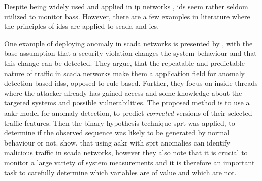 

\begin{comment}
	\begin{itemize}
		\item \parencite{Yang2006}
		\item \parencite{Celeda2012}
		\item \textcite{Pan2014} BACnet
			\begin{itemize}
				\item Anonmaly detection for BACnet fire alarm systems
				\item taps BACnet traffic via IP
				\item rule based learning (RIPPER)
				\item protection against common BACnet attack vectors
				\subitem who-is/who-has network probing
				\subitem write-property (take control over device)
				\subitem InitializedRoutingTable
				\subitem reinitialize devices
				\subitem application layer DoS
				\subitem flooding of network
			\end{itemize}
		
		\item \textcite{Eskin2002} algos for unsupervised anomaly detection in IDS
		\item \textcite{Leung2005} Unsupervised anomaly detection in IDS, proposed new algo \emph{pfMAFIA}
	\end{itemize}
\end{comment}

Despite being widely used and applied in \gls{ip} networks \parencite[cf.][pp.~201~ff.]{Northcutt2005}, \gls{ids} seem rather seldom utilized to monitor \glspl{bas}.
However, there are a few examples in literature where the principles of \glspl{ids} are applied to \gls{scada} and \gls{ics}.

One example of deploying anomaly in \gls{scada} networks is presented by \textcite{Yang2006}, with the base assumption that a security violation changes the system behaviour and that this change can be detected. They argue, that the repeatable and predictable nature of traffic in \gls{scada} networks make them a application field for anomaly detection based \glspl{ids}, opposed to rule based.
Further, they focus on inside threads where the attacker already has gained access and some knowledge about the targeted systems and possible vulnerabilities.
The proposed method is to use a \gls{aakr} model for anomaly detection, to predict \emph{corrected} versions of their selected traffic features. Then the binary hypothesis technique \gls{sprt} was applied, to determine if the observed sequence was likely to be generated by normal behaviour or not.
\textcite{Yang2006} show, that using \gls{aakr} with \gls{sprt} anomalies can identify malicious traffic in \gls{scada} networks, however they also note that it is crucial to monitor a large variety of system measurements and it is therefore an important task to carefully determine which variables are of value and which are not.

